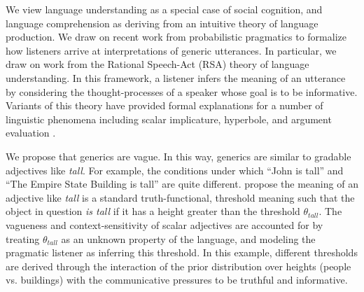 \documentclass[10pt,letterpaper]{article}
\begin{document}
We view language understanding as a special case of social cognition, and language comprehension as deriving from an intuitive theory of language production.  We draw on recent work from probabilistic pragmatics to formalize how listeners arrive at interpretations of generic utterances. In particular, we draw on work from the Rational Speech-Act (RSA) theory of language understanding. In this framework, a listener infers the meaning of an utterance by considering the thought-processes of a speaker whose goal is to be informative. Variants of this theory have provided formal explanations for a number of linguistic phenomena including scalar implicature, hyperbole, and argument evaluation \cite{Kao2014, Tessler2014, Lassiter2014}. 





We propose that generics are vague. In this way, generics are similar to gradable adjectives like \emph{tall}. For example, the conditions under which ``John is tall'' and ``The Empire State Building is tall'' are quite different.   propose the meaning of an adjective like \emph{tall} is a standard truth-functional, threshold meaning such that the object in question \emph{is tall} if it has a height greater than the threshold $\theta_{tall}$. 
The vagueness and context-sensitivity of scalar adjectives are accounted for by treating $\theta_{tall}$ as an unknown property of the language, and modeling the pragmatic listener as inferring this threshold. In this example, different thresholds are derived through the interaction of the prior distribution over heights (people vs. buildings) with the communicative pressures to be truthful and informative. 
 
\end{document}
